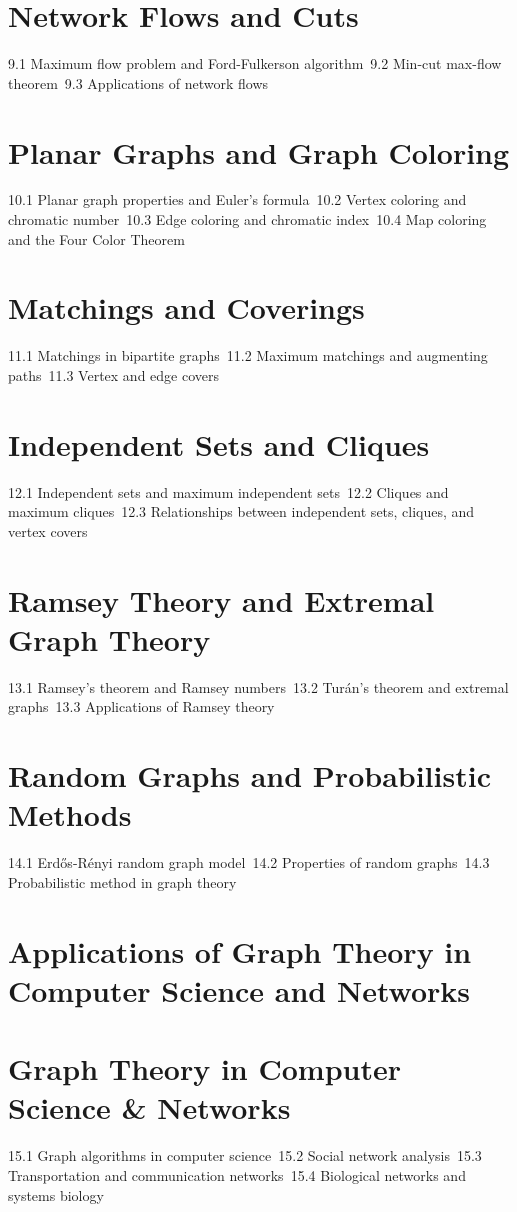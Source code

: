 \section{Network Flows and Cuts}
9.1 Maximum flow problem and Ford-Fulkerson algorithm\
9.2 Min-cut max-flow theorem\
9.3 Applications of network flows\
\section{Planar Graphs and Graph Coloring}
10.1 Planar graph properties and Euler's formula\
10.2 Vertex coloring and chromatic number\
10.3 Edge coloring and chromatic index\
10.4 Map coloring and the Four Color Theorem\
\section{Matchings and Coverings}
11.1 Matchings in bipartite graphs\
11.2 Maximum matchings and augmenting paths\
11.3 Vertex and edge covers\
\section{Independent Sets and Cliques}
12.1 Independent sets and maximum independent sets\
12.2 Cliques and maximum cliques\
12.3 Relationships between independent sets, cliques, and vertex covers\
\section{Ramsey Theory and Extremal Graph Theory}
13.1 Ramsey's theorem and Ramsey numbers\
13.2 Turán's theorem and extremal graphs\
13.3 Applications of Ramsey theory\
\section{Random Graphs and Probabilistic Methods}
14.1 Erdős-Rényi random graph model\
14.2 Properties of random graphs\
14.3 Probabilistic method in graph theory\
\section{Applications of Graph Theory in Computer Science and Networks}
\section{Graph Theory in Computer Science \& Networks}
15.1 Graph algorithms in computer science\
15.2 Social network analysis\
15.3 Transportation and communication networks\
15.4 Biological networks and systems biology\
